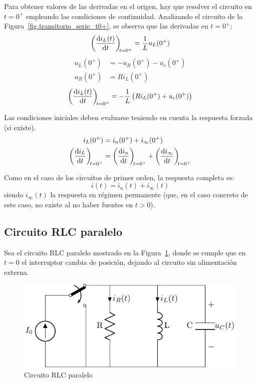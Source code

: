 Para obtener valores de las derivadas en el origen, hay que resolver
el circuito en \(t = 0^+\) empleando las condiciones de
continuidad. Analizando el circuito de la
Figura~\ref{fig.transitorio_serie_t0+}, se observa que las derivadas
en $t=0^+$:
\[
  \diff{i_L(t)}{t}[t = 0^+] = \frac{1}{L} u_L(0^+)
\]
\begin{align*}
  u_L(0^+) &= -u_R(0^+) - u_c(0^+)\\
  u_R(0^+) &= R i_L(0^+)
\end{align*}
\[ {\diff{i_L(t)}{t}[t = 0^+] = - \frac{1}{L}\left(R i_L(0^+) +
      u_c(0^+)\right)}
\]
\begin{remark}
  Las condiciones iniciales deben evaluarse teniendo en cuenta la
  respuesta forzada (si existe).
  \begin{align*}
    i_L(0^+) &= i_n(0^+) + i_{\infty}(0^+)\\
    \diff{i_L}{t}[t = 0^+] &= \diff{i_n}{t}[t = 0^+] + \diff{i_{\infty}}{t}[t = 0^+]  
  \end{align*}
\end{remark}
Como en el caso de los circuitos de primer orden, la respuesta
completa es:
\begin{equation*}
  i(t)=i_n(t)+i_\infty(t)
\end{equation*}
siendo $i_\infty(t)$ la respuesta en régimen permanente (que, en el
caso concreto de este caso, no existe al no haber fuentes en $t>0$).

\subsection{Circuito RLC paralelo}

Sea el circuito RLC paralelo mostrado en la
Figura~\ref{fig.transitorio_circuito_RLC_paralelo}, donde se cumple
que en $t = 0$ el interruptor cambia de posición, dejando al circuito
sin alimentación externa.
\begin{figure}[H]
  \centering
  \includegraphics{../figs/transitorio_circuitoRLC_paralelo.pdf}
  \caption{Circuito RLC paralelo}
  \label{fig.transitorio_circuito_RLC_paralelo}
\end{figure}

